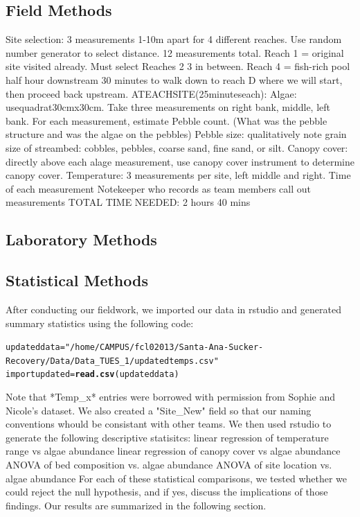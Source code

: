 \documentclass{article}\usepackage[]{graphicx}\usepackage[]{color}
\makeatletter
\newcommand{\hlstr}[1]{\textcolor[rgb]{0.192,0.494,0.8}{#1}}%
\newcommand{\hlstd}[1]{\textcolor[rgb]{0.345,0.345,0.345}{#1}}%
\newcommand{\hlkwb}[1]{\textcolor[rgb]{0.69,0.353,0.396}{#1}}%
\newcommand{\hlkwd}[1]{\textcolor[rgb]{0.737,0.353,0.396}{\textbf{#1}}}%
\newenvironment{kframe}{%
 \def\at@end@of@kframe{}%
 \ifinner\ifhmode%
  \def\at@end@of@kframe{\end{minipage}}%
  \begin{minipage}{\columnwidth}%
 \fi\fi%
 \def\FrameCommand##1{\hskip\@totalleftmargin \hskip-\fboxsep
 \colorbox{shadecolor}{##1}\hskip-\fboxsep
     \hskip-\linewidth \hskip-\@totalleftmargin \hskip\columnwidth}%
 \MakeFramed {\advance\hsize-\width
   \@totalleftmargin\z@ \linewidth\hsize
   \@setminipage}}%
 {\par\unskip\endMakeFramed%
 \at@end@of@kframe}
\newenvironment{knitrout}{}{} %
\makeatother
\begin{document}
\subsection{Field Methods}
Site selection: 3 measurements 1-10m apart for 4 diﬀerent reaches. Use random number generator to select distance. 12 measurements total. Reach 1 = original site visited already. Must select Reaches 2 3 in between. Reach 4 = ﬁsh-rich pool half hour downstream 30 minutes to walk down to reach D where we will start, then proceed back upstream. ATEACHSITE(25minuteseach): Algae: usequadrat30cmx30cm. Take three measurements on right bank, middle, left bank. For each measurement, estimate Pebble count. (What was the pebble structure and was the algae on the pebbles) Pebble size: qualitatively note grain size of streambed: cobbles, pebbles, coarse sand, ﬁne sand, or silt. Canopy cover: directly above each alage measurement, use canopy cover instrument to determine canopy cover. Temperature: 3 measurements per site, left middle and right. Time of each measurement Notekeeper who records as team members call out measurements TOTAL TIME NEEDED: 2 hours 40 mins
\subsection{Laboratory Methods}

\subsection{Statistical Methods}
After conducting our ﬁeldwork, we imported our data in rstudio and generated summary statistics using the following code: 
\begin{knitrout}
\color{fgcolor}\begin{kframe}
\begin{alltt}
\hlstd{updateddata}\hlkwb{=} \hlstr{"/home/CAMPUS/fcl02013/Santa-Ana-Sucker-Recovery/Data/Data_TUES_1/updatedtemps.csv"}
\hlstd{importupdated}\hlkwb{=}\hlkwd{read.csv}\hlstd{(updateddata)}
\end{alltt}
\end{kframe}
\end{knitrout}

Note that *Temp_x* entries were borrowed with permission from Sophie and Nicole's dataset. We also created a "Site_New" field so that our naming conventions whould be consistant with other teams. We then used rstudio to generate the following descriptive statisitcs:  
linear regression of temperature range vs algae abundance
linear regression of canopy cover vs algae abundance
ANOVA of bed composition vs. algae abundance
ANOVA of site location vs. algae abundance
For each of these statistical comparisons, we tested whether we could reject the null hypothesis, and if yes, discuss the implications of those findings. Our results are summarized in the following section. 
\end{document}
